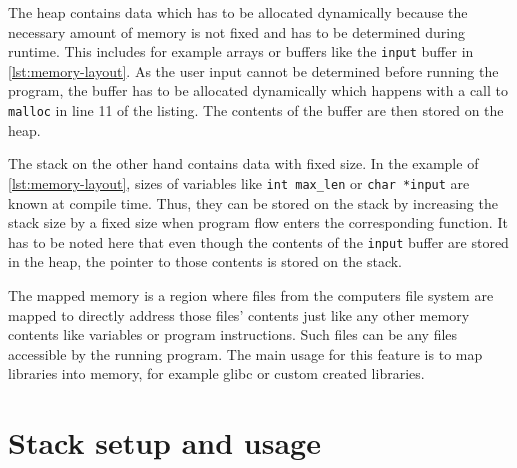 The heap contains data which has to be allocated dynamically because the necessary amount of memory is not fixed and has to be determined during runtime.
This includes for example arrays or buffers like the \texttt{input} buffer in \cref{lst:memory-layout}.
As the user input cannot be determined before running the program, the buffer has to be allocated dynamically which happens with a call to \texttt{malloc} in line 11 of the listing.
The contents of the buffer are then stored on the heap.

The stack on the other hand contains data with fixed size.
In the example of \cref{lst:memory-layout}, sizes of variables like \texttt{int max\_len} or \texttt{char *input} are known at compile time.
Thus, they can be stored on the stack by increasing the stack size by a fixed size when program flow enters the corresponding function.
It has to be noted here that even though the contents of the \texttt{input} buffer are stored in the heap, the pointer to those contents is stored on the stack.

The mapped memory is a region where files from the computers file system are mapped to directly address those files' contents just like any other memory contents like variables or program instructions.
Such files can be any files accessible by the running program.
The main usage for this feature is to map libraries into memory, for example \gls{glibc} or custom created libraries.



\section{Stack setup and usage}
\label{sec:stack-setup-and-usage}

